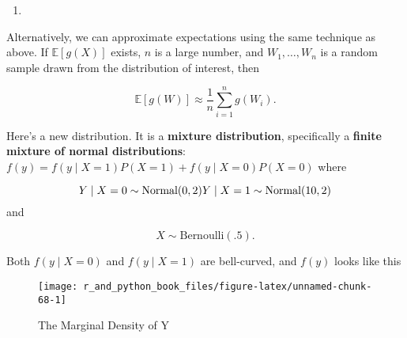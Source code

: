 \documentclass[12pt,krantz2]{krantz}
\begin{document}
\begin{enumerate}
\def\labelenumi{\arabic{enumi}.}
\setcounter{enumi}{6}
\item
\end{enumerate}

Alternatively, we can approximate expectations using the same technique as above. If \(\mathbb{E}[g(X)]\) exists, \(n\) is a large number, and \(W_1, \ldots, W_n\) is a random sample drawn from the distribution of interest, then

\begin{equation} 
\mathbb{E}[g(W)] \approx \frac{1}{n}\sum_{i=1}^n g(W_i).
\end{equation}

Here's a new distribution. It is a \textbf{mixture distribution}, specifically a \textbf{finite mixture of normal distributions}: \(f(y) = f(y \mid X=1)P(X=1) + f(y \mid X=0)P(X=0)\) where

\begin{equation} 
Y \mid X=0 \sim \text{Normal}(0, 2) \\
Y \mid X=1 \sim \text{Normal}(10, 2)
\end{equation}
and

\begin{equation} 
X \sim \text{Bernoulli}(.5).
\end{equation}

Both \(f(y \mid X=0)\) and \(f(y \mid X=1)\) are bell-curved, and \(f(y)\) looks like this

\begin{figure}

{\centering \texttt{[image: r\_and\_python\_book\_files/figure-latex/unnamed-chunk-68-1]} 

}

\caption{The Marginal Density of Y}\label{fig:unnamed-chunk-68}
\end{figure}
\end{document}
